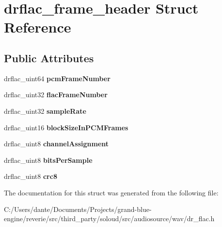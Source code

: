 \hypertarget{structdrflac__frame__header}{}\section{drflac\+\_\+frame\+\_\+header Struct Reference}
\label{structdrflac__frame__header}
\subsection*{Public Attributes}
\begin{DoxyCompactItemize}
\item 
\mbox{\label{structdrflac__frame__header_ad88f42b0701514e5ea5dfe4e02607e84}} 
drflac\+\_\+uint64 {\bfseries pcm\+Frame\+Number}
\item 
\mbox{\label{structdrflac__frame__header_a6bf5c5a4487b2e24625169cc6d901c37}} 
drflac\+\_\+uint32 {\bfseries flac\+Frame\+Number}
\item 
\mbox{\label{structdrflac__frame__header_a2c3c2beeeb4bd55b7162db6b4057607d}} 
drflac\+\_\+uint32 {\bfseries sample\+Rate}
\item 
\mbox{\label{structdrflac__frame__header_a17e61d0eb9b14de00bf98c44f8f250e6}} 
drflac\+\_\+uint16 {\bfseries block\+Size\+In\+P\+C\+M\+Frames}
\item 
\mbox{\label{structdrflac__frame__header_aef08e4c6301bb16e445872fefe68ee66}} 
drflac\+\_\+uint8 {\bfseries channel\+Assignment}
\item 
\mbox{\label{structdrflac__frame__header_af4f22f5d0e8ba8e81e665508923badce}} 
drflac\+\_\+uint8 {\bfseries bits\+Per\+Sample}
\item 
\mbox{\label{structdrflac__frame__header_ae4dcca09d798cc45ff09765d71d31523}} 
drflac\+\_\+uint8 {\bfseries crc8}
\end{DoxyCompactItemize}


The documentation for this struct was generated from the following file\+:\begin{DoxyCompactItemize}
\item 
C\+:/\+Users/dante/\+Documents/\+Projects/grand-\/blue-\/engine/reverie/src/third\+\_\+party/soloud/src/audiosource/wav/dr\+\_\+flac.\+h\end{DoxyCompactItemize}
